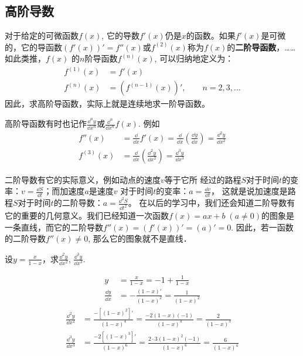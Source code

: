 \subsection{高阶导数}
对于给定的可微函数$f(x)$, 它的导数$f'(x)$仍是$x$的函数。如果$f'(x)$是可微的，它的导函数$(f'(x))'=f''(x)$或$f^{(2)}(x)$称为$f(x)$的\textbf{二阶导函数}，……如此类推，$f(x)$
的$n$阶导函数$f^{(n)}(x)$, 可以归纳地定义为：
\[\begin{split}
  f ^{(1)} (x)&=f'(x)\\
  f ^{(n)} (x)&=\left(f^{(n-1)}(x)\right)',\qquad n=2,3,\ldots  
\end{split}\]
因此，求高阶导函数，实际上就是连续地求一阶导函数。

高阶导函数有时也记作$\frac{\dd^n y}{\dd x^n}$或$\frac{\dd^n }{\dd x^n}f(x)$. 例如
\[\begin{split}
    f''(x)&=\frac{\dd}{\dd x}f'(x)=\frac{\dd}{\dd x}\left(\frac{\dd y}{\dd x}\right)=\frac{\dd^2 y}{\dd x^2}\\
    f^{(3)}(x)&=\frac{\dd}{\dd x}\left(\frac{\dd^2 y}{\dd x^2}\right)=\frac{\dd^3 y}{\dd x^3}
\end{split}\]

二阶导数有它的实际意义，例如动点的速度$v$等于它所
经过的路程$S$对于时间$t$的变率：$v=\frac{\dd S}{\dd t}$；而加速度$a$是速度$v$
对于时间$t$的变率：$a=\frac{\dd v}{\dd t}$，
这就是说加速度是路程$S$对于时间$t$的二阶导数：$a=\frac{\dd^2 S}{\dd t^2}$。
在以后的学习中，我们还会知道二阶导数有它的重要的几何意义。我们已经知道一次函数$f(x)=ax+b\; (a\ne 0)$的图象是一条直线，而它的二阶导数$f''(x)=(f'(x))'=(a)'=0$. 因此，若一函数的二阶导数$f''(x)\ne 0$, 那么它的图象就不是直线．

\begin{example}
设$y=\frac{x}{1-x}$，求$\frac{\dd^2 y}{\dd x^2}$, $\frac{\dd^3 y}{\dd x^3}$.
\end{example}

\begin{solution}
\[\begin{split}
    y&=\frac{x}{1-x}=-1+\frac{1}{1-x}\\
\frac{\dd y}{\dd x}&=-\frac{(1-x)'}{(1-x)^2}=\frac{1}{(1-x)^2}
\end{split}\]
\[\begin{split}
    \frac{\dd^2 y}{\dd x^2}&=\frac{-[(1-x)^2]'}{(1-x)^4}=\frac{-2(1-x)(-1)}{(1-x)^4}=\frac{2}{(1-x)^3}\\
    \frac{\dd^3 y}{\dd x^3}&=\frac{-2[(1-x)^3]'}{(1-x)^6}=\frac{2\cdot 3(1-x)^2(-1)}{(1-x)^6}=\frac{6}{(1-x)^4}  
\end{split}\]
\end{solution}


